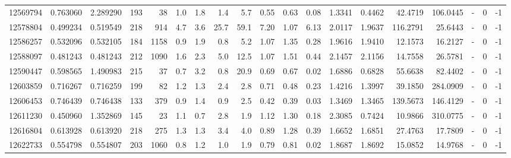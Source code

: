 \begin{tabular}{rrrrrrrrrrrrrrrrlrr}
  12569794 & 0.763060 &   2.289290 &  193 &   38 &      1.0 &      1.8 &     1.4 &      5.7 &       0.55 &        0.63 &        0.08 &  1.3341 &  0.4462 &   42.4719 &  106.0445 &             - &        0 &         -1 \\
  12578804 & 0.499234 &   0.519549 &  218 &  914 &      4.7 &      3.6 &    25.7 &     59.1 &       7.20 &        1.07 &        6.13 &  2.0117 &  1.9637 &  116.2791 &   25.6443 &             - &        0 &         -1 \\
  12586257 & 0.532096 &   0.532105 &  184 & 1158 &      0.9 &      1.9 &     0.8 &      5.2 &       1.07 &        1.35 &        0.28 &  1.9616 &  1.9410 &   12.1573 &   16.2127 &             - &        0 &         -1 \\
  12588097 & 0.481243 &   0.481243 &  212 & 1090 &      1.6 &      2.3 &     5.0 &     12.5 &       1.07 &        1.51 &        0.44 &  2.1457 &  2.1156 &   14.7558 &   26.5781 &             - &        0 &         -1 \\
  12590447 & 0.598565 &   1.490983 &  215 &   37 &      0.7 &      3.2 &     0.8 &     20.9 &       0.69 &        0.67 &        0.02 &  1.6886 &  0.6828 &   55.6638 &   82.4402 &             - &        0 &         -1 \\
  12603859 & 0.716267 &   0.716259 &  199 &   82 &      1.2 &      1.3 &     2.4 &      2.8 &       0.71 &        0.48 &        0.23 &  1.4216 &  1.3997 &   39.1850 &  284.0909 &             - &        0 &         -1 \\
  12606453 & 0.746439 &   0.746438 &  133 &  379 &      0.9 &      1.4 &     0.9 &      2.5 &       0.42 &        0.39 &        0.03 &  1.3469 &  1.3465 &  139.5673 &  146.4129 &             - &        0 &         -1 \\
  12611230 & 0.450960 &   1.352869 &  145 &   23 &      1.1 &      0.7 &     2.8 &      1.9 &       1.12 &        1.30 &        0.18 &  2.3085 &  0.7424 &   10.9866 &  310.0775 &             - &        0 &         -1 \\
  12616804 & 0.613928 &   0.613920 &  218 &  275 &      1.3 &      1.3 &     3.4 &      4.0 &       0.89 &        1.28 &        0.39 &  1.6652 &  1.6851 &   27.4763 &   17.7809 &             - &        0 &         -1 \\
  12622733 & 0.554798 &   0.554807 &  203 & 1060 &      0.8 &      1.2 &     1.0 &      1.9 &       0.79 &        0.81 &        0.02 &  1.8687 &  1.8692 &   15.0852 &   14.9768 &             - &        0 &         -1 \\

\end{tabular}
